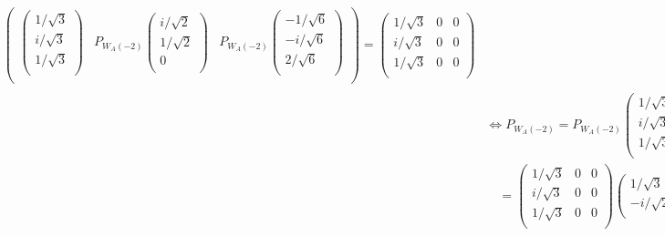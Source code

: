 \documentclass[dvipdfmx]{jsarticle}
\begin{document}
\begin{align*}
\begin{pmatrix}
\begin{pmatrix}
{1}/{\sqrt{3}} \\
{i}/{\sqrt{3}} \\
{1}/{\sqrt{3}} \\
\end{pmatrix} & P_{W_{A}( - 2)}\begin{pmatrix}
{i}/{\sqrt{2}} \\
{1}/{\sqrt{2}} \\
0 \\
\end{pmatrix} & P_{W_{A}( - 2)}\begin{pmatrix}
 - {1}/{\sqrt{6}} \\
 - {i}/{\sqrt{6}} \\
{2}/{\sqrt{6}} \\
\end{pmatrix} \\
\end{pmatrix} = \begin{pmatrix}
{1}/{\sqrt{3}} & 0 & 0 \\
{i}/{\sqrt{3}} & 0 & 0 \\
{1}/{\sqrt{3}} & 0 & 0 \\
\end{pmatrix}\\
&\Leftrightarrow P_{W_{A}( - 2)} = P_{W_{A}( - 2)}\begin{pmatrix}
{1}/{\sqrt{3}} & {i}/{\sqrt{2}} & - {1}/{\sqrt{6}} \\
{i}/{\sqrt{3}} & {1}/{\sqrt{2}} & - {i}/{\sqrt{6}} \\
{1}/{\sqrt{3}} & 0 & {2}/{\sqrt{6}} \\
\end{pmatrix}\begin{pmatrix}
{1}/{\sqrt{3}} & {i}/{\sqrt{2}} & - {1}/{\sqrt{6}} \\
{i}/{\sqrt{3}} & {1}/{\sqrt{2}} & - {i}/{\sqrt{6}} \\
{1}/{\sqrt{3}} & 0 & {2}/{\sqrt{6}} \\
\end{pmatrix}^{*} \\
&\quad = \begin{pmatrix}
{1}/{\sqrt{3}} & 0 & 0 \\
{i}/{\sqrt{3}} & 0 & 0 \\
{1}/{\sqrt{3}} & 0 & 0 \\
\end{pmatrix}\begin{pmatrix}
{1}/{\sqrt{3}} & - {i}/{\sqrt{3}} & {1}/{\sqrt{3}} \\
 - {i}/{\sqrt{2}} & {1}/{\sqrt{2}} & 0 \\

\end{pmatrix}
\end{align*}
\end{document}
